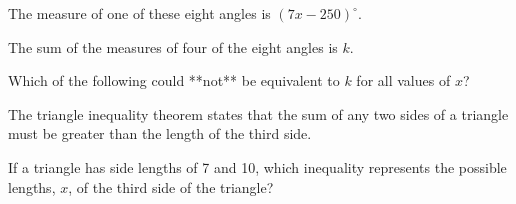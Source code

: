 The measure of one of these eight angles is \((7x - 250)^\circ\).

The sum of the measures of four of the eight angles is \(k\).

Which of the following could **not** be equivalent to \(k\) for all values of \(x\)?

\vspace{0.75em}


\vspace{2em}
\newpage

\noindent\markforreview
\vspace{1em}

The triangle inequality theorem states that the sum of any two sides of a triangle must be greater than the length of the third side.

If a triangle has side lengths of 7 and 10, which inequality represents the possible lengths, \(x\), of the third side of the triangle?

\vspace{0.75em}


\vspace{2em}
